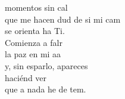 \begin{cancion}
	momentos sin cal  \\
	que me hacen dud de si mi cam\\
	se orienta ha Ti.\\
	\jump
	Comienza a falr \\
	la paz en mi aa \\
	y, sin esparlo, apareces \\
	haciénd ver\\
	que a nada he de tem.\\
	\jump
\end{cancion}%
